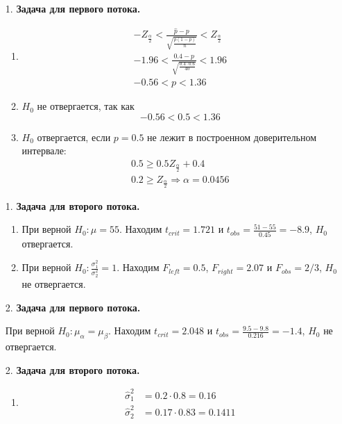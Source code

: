 \begin{enumerate}

\item[1.] \textbf{Задача для первого потока.}

\begin{enumerate}
\item \begin{align*}
-Z_{\frac{\alpha}{2}}<\frac{\hat{p}-p}{\sqrt{\frac{\hat{p}(1-\hat{p})}{n}}}<Z_{\frac{\alpha}{2}} \\
-1.96<\frac{0.4-p}{\sqrt{\frac{0.4\cdot0.6}{40}}}<1.96 \\
-0.56<p<1.36
\end{align*}

\item $H_0$ не отвергается, так как
\[
-0.56<0.5<1.36
\]

\item $H_0$ отвергается, если $p=0.5$ не лежит в построенном доверительном интервале:
\begin{align*}
0.5\geq0.5Z_{\frac{\alpha}{2}}+0.4 \\
0.2\geq Z_{\frac{\alpha}{2}} \Rightarrow \alpha=0.0456
\end{align*}

\end{enumerate}

\item[1.] \textbf{Задача для второго потока.}
\begin{enumerate}
\item
При верной $H_0: \mu=55$.
Находим $t_{crit} = 1.721$ и $t_{obs} = \frac{51-55}{0.45}= -8.9$, $H_0$ отвергается.

\item
При верной $H_0: \frac{\sigma^2_1}{\sigma^2_2}=1$.
Находим $F_{left} = 0.5$, $F_{right}=2.07$ и $F_{obs} = 2/3$, $H_0$ не отвергается.
\end{enumerate}

\item[2.] \textbf{Задача для первого потока.}

При верной $H_0: \mu_{\alpha}=\mu_{\beta}$.
Находим $t_{crit} = 2.048$ и $t_{obs} =\frac{9.5-9.8}{0.216}= -1.4$, $H_0$ не отвергается.

\item[2.] \textbf{Задача для второго потока.}
\begin{enumerate}
\item
\begin{align*}
\hat{\sigma}^2_1 &= 0.2 \cdot 0.8 = 0.16 \\
\hat{\sigma}^2_2 &= 0.17 \cdot 0.83 = 0.1411
\end{align*}


\end{enumerate}
\end{enumerate}
